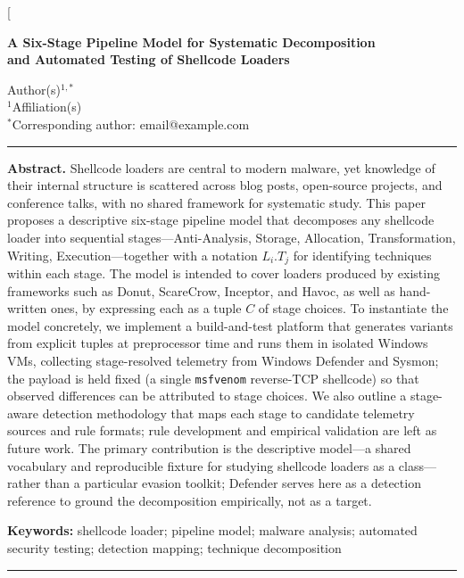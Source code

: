 \documentclass[10pt,a4paper,twocolumn]{article}
\begin{document}
\twocolumn[
\begin{@twocolumnfalse}

\begin{center}
    {\Large\bfseries A Six-Stage Pipeline Model for Systematic Decomposition\\
    and Automated Testing of Shellcode Loaders}
    \vspace{12pt}

    {\normalsize
    Author(s)$^{1,*}$\\[4pt]
    $^1$Affiliation(s)\\[4pt]
    $^*$Corresponding author: email@example.com
    }

    \vspace{12pt}
\end{center}

\noindent\rule{\textwidth}{0.4pt}
\vspace{4pt}

{\small\sffamily
\noindent\textbf{Abstract.}
Shellcode loaders are central to modern malware, yet knowledge of their internal structure is scattered across blog posts, open-source projects, and conference talks, with no shared framework for systematic study.
This paper proposes a descriptive six-stage pipeline model that decomposes any shellcode loader into sequential stages---Anti-Analysis, Storage, Allocation, Transformation, Writing, Execution---together with a notation $L_i.T_j$ for identifying techniques within each stage.
The model is intended to cover loaders produced by existing frameworks such as Donut, ScareCrow, Inceptor, and Havoc, as well as hand-written ones, by expressing each as a tuple $C$ of stage choices.
To instantiate the model concretely, we implement a build-and-test platform that generates variants from explicit tuples at preprocessor time and runs them in isolated Windows VMs, collecting stage-resolved telemetry from Windows Defender and Sysmon; the payload is held fixed (a single \texttt{msfvenom} reverse-TCP shellcode) so that observed differences can be attributed to stage choices.
We also outline a stage-aware detection methodology that maps each stage to candidate telemetry sources and rule formats; rule development and empirical validation are left as future work.
The primary contribution is the descriptive model---a shared vocabulary and reproducible fixture for studying shellcode loaders as a class---rather than a particular evasion toolkit; Defender serves here as a detection reference to ground the decomposition empirically, not as a target.
}

\vspace{4pt}

{\small\sffamily
\noindent\textbf{Keywords:} shellcode loader; pipeline model; malware analysis; automated security testing; detection mapping; technique decomposition
}

\vspace{4pt}
\noindent\rule{\textwidth}{0.4pt}
\vspace{12pt}

\end{@twocolumnfalse}
\end{document}
